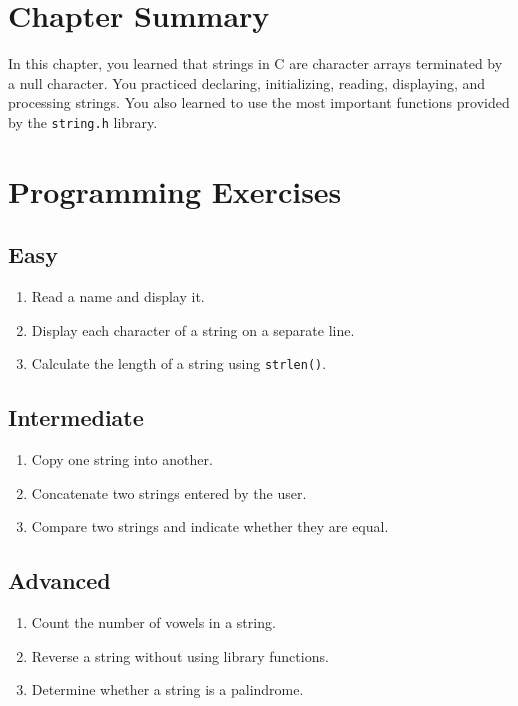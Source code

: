 \documentclass[12pt,openany]{book}
\begin{document}
\section{Chapter Summary}

In this chapter, you learned that strings in C are character arrays terminated by a null character. You practiced declaring, initializing, reading, displaying, and processing strings. You also learned to use the most important functions provided by the \texttt{string.h} library.

\section{Programming Exercises}

\subsection*{Easy}

\begin{enumerate}
    \item Read a name and display it.
    \item Display each character of a string on a separate line.
    \item Calculate the length of a string using \texttt{strlen()}.
\end{enumerate}

\subsection*{Intermediate}

\begin{enumerate}
    \item Copy one string into another.
    \item Concatenate two strings entered by the user.
    \item Compare two strings and indicate whether they are equal.
\end{enumerate}

\subsection*{Advanced}

\begin{enumerate}
    \item Count the number of vowels in a string.
    \item Reverse a string without using library functions.
    \item Determine whether a string is a palindrome.
\end{enumerate}
\end{document}
